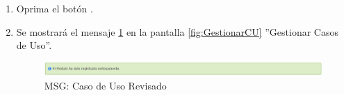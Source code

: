 \begin{enumerate}
				\item Oprima el botón \IUAceptar.
				
				\item Se mostrará el mensaje \ref{fig:CURevisado} en la pantalla \ref{fig:GestionarCU} ''Gestionar Casos de Uso''.
				
				\begin{figure}[htbp!]
					\begin{center}
						\includegraphics[scale=0.6]{roles/lider/casosUso/pantallas/IU5-1MSG1}
						\caption{MSG: Caso de Uso Revisado}
						\label{fig:CURevisado}
					\end{center}
				\end{figure}
			
			\end{enumerate}